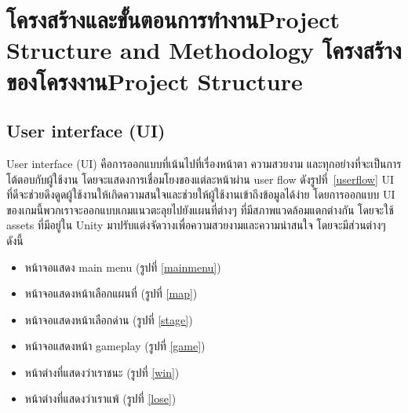 \chapter{\ifproject%
\ifcpe โครงสร้างและขั้นตอนการทำงาน\else Project Structure and Methodology\fi
\else%
\ifcpe โครงสร้างของโครงงาน\else Project Structure\fi
\fi
}


\makeatletter


\makeatother

\section{User interface (UI)}
User interface (UI) คือการออกแบบที่เน้นไปที่เรื่องหน้าตา ความสวยงาม และทุกอย่างที่จะเป็นการโต้ตอบกับผู้ใช้งาน โดยจะแสดงการเชื่อมโยงของแต่ละหน้าผ่าน user flow ดังรูปที่~\ref{userflow} UI ที่ดีจะช่วยดึงดูดผู้ใช้งานให้เกิดความสนใจและช่วยให้ผู้ใช้งานเข้าถึงข้อมูลได้ง่าย
โดยการออกแบบ UI ของเกมนี้พวกเราจะออกแบบเกมแนวตะลุยไปยังแผนที่ต่างๆ ที่มีสภาพแวดล้อมแตกต่างกัน โดยจะใช้ assets ที่มีอยู่ใน Unity มาปรับแต่งจัดวางเพื่อความสวยงามและความน่าสนใจ โดยจะมีส่วนต่างๆ ดังนี้
\begin{itemize}
\item หน้าจอแสดง main menu (รูปที่ \ref{mainmenu})
\item หน้าจอแสดงหน้าเลือกแผนที่ (รูปที่ \ref{map})
\item หน้าจอแสดงหน้าเลือกด่าน (รูปที่ \ref{stage})
\item หน้าจอแสดงหน้า gameplay (รูปที่ \ref{game})
\item หน้าต่างที่แสดงว่าเราชนะ (รูปที่ \ref{win})
\item หน้าต่างที่แสดงว่าเราแพ้ (รูปที่ \ref{lose})
\end{itemize}

